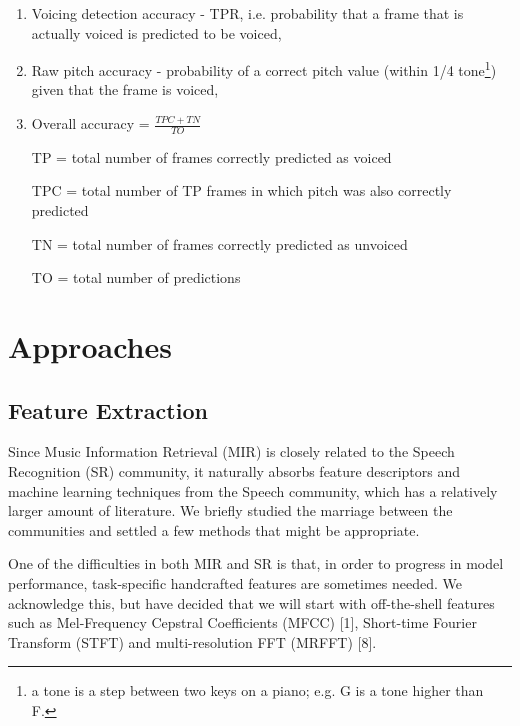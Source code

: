 \documentclass{article} %
\begin{document}
\begin{enumerate}
\item Voicing detection accuracy - TPR, i.e. probability that a frame that is actually voiced is predicted to be voiced,
\item Raw pitch accuracy - probability of a correct pitch value (within 1/4 tone\footnote{a tone is a step between two keys on a piano; e.g. G is a tone higher than F.}) given that the frame is voiced,
\item Overall accuracy = $\frac{TPC+TN}{TO}$


TP = total number of frames correctly predicted as voiced

TPC = total number of TP frames in which pitch was also correctly predicted

TN = total number of frames correctly predicted as unvoiced

TO = total number of predictions

\end{enumerate}


\section{Approaches}
\subsection{Feature Extraction}
Since Music Information Retrieval (MIR) is closely related to the Speech Recognition (SR) community, it naturally absorbs feature descriptors and 
machine learning techniques from the Speech community, which has a relatively larger amount of literature.
We briefly studied the marriage between the communities and settled a few methods that might be appropriate. 

One of the difficulties in both MIR and SR is that, in order to progress in model performance, task-specific handcrafted features are sometimes needed.  We acknowledge this, but have decided that we will start with off-the-shell features such as Mel-Frequency Cepstral Coefficients (MFCC) [1], Short-time Fourier Transform (STFT) and multi-resolution FFT (MRFFT) [8].
\end{document}
